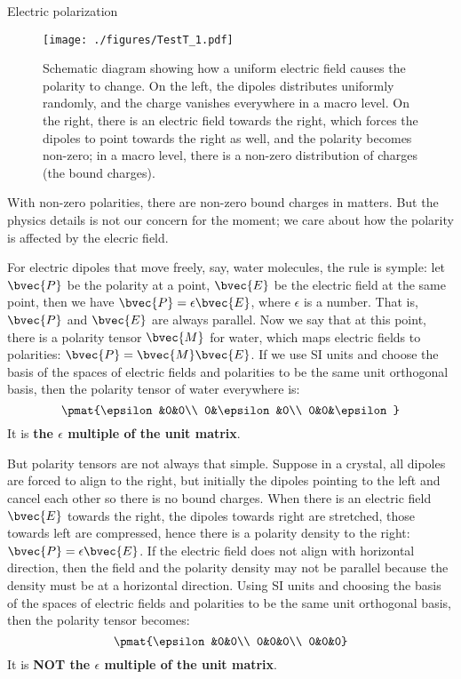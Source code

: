 \begin{example}{Electric polarization}
\begin{figure}[ht]
\centering
\texttt{[image: ./figures/TestT\_1.pdf]}
\caption{Schematic diagram showing how a uniform electric field causes the polarity to change. On the left, the dipoles distributes uniformly randomly, and the charge vanishes everywhere in a macro level. On the right, there is an electric field towards the right, which forces the dipoles to point towards the right as well, and the polarity becomes non-zero; in a macro level, there is a non-zero distribution of charges (the bound charges). } \label{TestT_fig1}
\end{figure}




With non-zero polarities, there are non-zero bound charges in matters. But the physics details is not our concern for the moment; we care about how the polarity is affected by the elecric field. 

For electric dipoles that move freely, say, water molecules, the rule is symple: let $\bvec{P}$ be the polarity at a point, $\bvec{E}$ be the electric field at the same point, then we have $\bvec{P}=\epsilon\bvec{E}$, where $\epsilon$ is a number. That is, $\bvec{P}$ and $\bvec{E}$ are always parallel. Now we say that at this point, there is a polarity tensor $\bvec{M}$ for water, which maps electric fields to polarities: $\bvec{P}=\bvec{M}\bvec{E}$. If we use SI units and choose the basis of the spaces of electric fields and polarities to be the same unit orthogonal basis, then the polarity tensor of water everywhere is: 
\begin{equation}
\pmat{\epsilon&0&0\\ 0&\epsilon&0\\ 0&0&\epsilon}
\end{equation}
It is \textbf{the $\epsilon$ multiple of the unit matrix}. 

But polarity tensors are not always that simple. Suppose in a crystal, all dipoles are forced to align to the right, but initially the dipoles pointing to the left and cancel each other so there is no bound charges. When there is an electric field $\bvec{E}$ towards the right, the dipoles towards right are stretched, those towards left are compressed, hence there is a polarity density to the right: $\bvec{P}=\epsilon\bvec{E}$. If the electric field does not align with horizontal direction, then the field and the polarity density may not be parallel because the density must be at a horizontal direction. Using SI units and choosing the basis of the spaces of electric fields and polarities to be the same unit orthogonal basis, then the polarity tensor becomes: 
\begin{equation}
\pmat{\epsilon&0&0\\ 0&0&0\\ 0&0&0}
\end{equation}
It is \textbf{NOT the $\epsilon$ multiple of the unit matrix}. 


\end{example}
